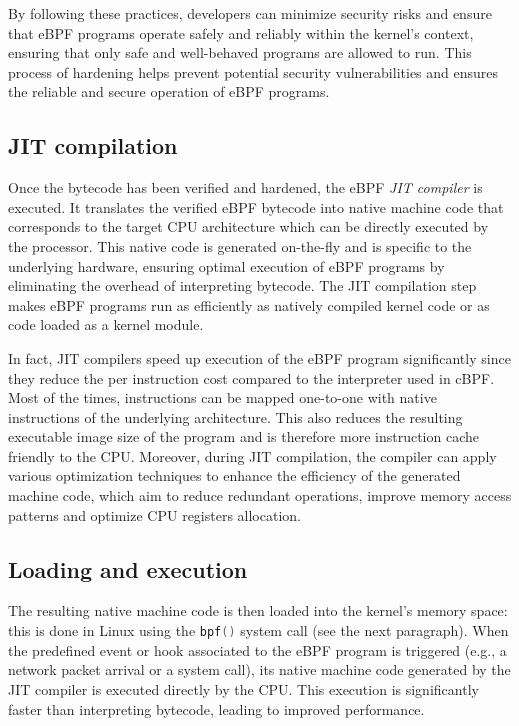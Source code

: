 By following these practices, developers can minimize security risks and ensure that eBPF programs operate safely and reliably within the kernel's context, ensuring that only safe and well-behaved programs are allowed to run.
This process of hardening helps prevent potential security vulnerabilities and ensures the reliable and secure operation of eBPF programs.

\subsection{JIT compilation}

Once the bytecode has been verified and hardened, the eBPF \textit{JIT compiler} is executed. 
It translates the verified eBPF bytecode into native machine code that corresponds to the target CPU architecture which can be directly executed by the processor. 
This native code is generated on-the-fly and is specific to the underlying hardware, ensuring optimal execution of eBPF programs by eliminating the overhead of interpreting bytecode.
The JIT compilation step makes eBPF programs run as efficiently as natively compiled kernel code or as code loaded as a kernel module.

In fact, JIT compilers speed up execution of the eBPF program significantly since they reduce the per instruction cost compared to the interpreter used in cBPF. 
Most of the times, instructions can be mapped one-to-one with native instructions of the underlying architecture. 
This also reduces the resulting executable image size of the program and is therefore more instruction cache friendly to the CPU.
Moreover, during JIT compilation, the compiler can apply various optimization techniques to enhance the efficiency of the generated machine code, which aim to reduce redundant operations, improve memory access patterns and optimize CPU registers allocation.

\subsection{Loading and execution}

The resulting native machine code is then loaded into the kernel's memory space: this is done in Linux using the \colorbox{backcolour}{\lstinline[style=cstyle, language=C]|bpf()|} system call (see the next paragraph).
When the predefined event or hook associated to the eBPF program is triggered (e.g., a network packet arrival or a system call), its native machine code generated by the JIT compiler is executed directly by the CPU. 
This execution is significantly faster than interpreting bytecode, leading to improved performance.

